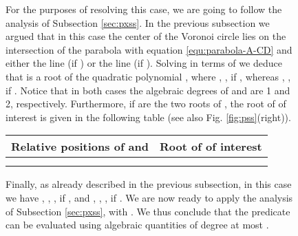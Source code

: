 \documentclass[letterpaper,11pt]{article}
\newcommand{\vor}{Voronoi\xspace}
\begin{document}
{\begin{figure}[!b]
For the purposes of resolving this case, we are going to follow the
analysis of Subsection \ref{sec:pxss}. In the previous subsection
we argued that in this case the center  of the \vor
circle  lies on the intersection of the parabola with
equation \eqref{equ:parabola-A-CD} and either the line 
(if ) or the line  (if
). Solving in terms of  we deduce that  is
a root of the quadratic polynomial , where
,
,
if , whereas
,
,
if .
Notice that in both cases the algebraic degrees of  and  are
1 and 2, respectively. Furthermore, if  are the two roots
of , the root of  of interest is given in the following
table (see also Fig. \ref{fig:pss}(right)).
\begin{center}
\begin{tabular}{|c|c|}
\hline
Relative positions of  and  & Root of  of interest\\
\hline \hline
&\\\hline
&\\\hline
\end{tabular}
\end{center}
Finally, as already 
described in the previous subsection, in this case we have ,
, , if , and
, , , if .
We are now ready to apply the analysis of Subsection \ref{sec:pxss},
with . We thus conclude that 
the predicate  can be evaluated using algebraic
quantities of degree at most .

\begin{comment}
\begin{table}[t]
\begin{center}
\begin{tabular}{|c|c|}
\hline
Relative positions of  and  & Root of  of interest\\
\hline \hline
&\\\hline
&\\\hline
\end{tabular}
\end{center}
\caption{Root of  that corresponds to  as a function of the
  relative positions of  and ; here  is assumed -axis
  parallel, while  is -axis parallel.}
\label{Table:PSSSxy}
\end{table}
\end{comment}






















\end{figure}}
\end{document}
